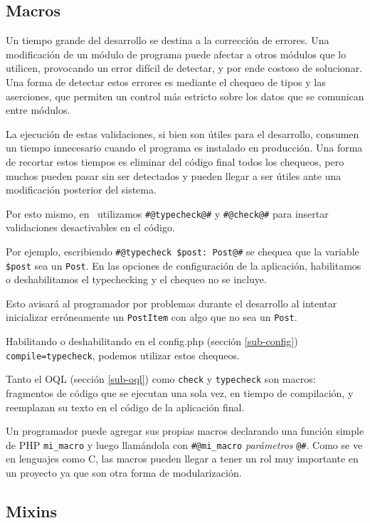 \subsection{Macros}
\label{sub-macros}

Un tiempo grande del desarrollo se destina a la corrección de errores. Una modificación de un módulo de programa puede afectar a otros módulos que lo utilicen, provocando un error difícil de detectar, y por ende costoso de solucionar. Una forma de detectar estos errores es mediante el chequeo de tipos y las aserciones, que permiten un control más estricto sobre los datos que se comunican entre módulos.

La ejecución de estas validaciones, si bien son útiles para el desarrollo, consumen un tiempo innecesario cuando el programa es instalado en producción. Una forma de recortar estos tiempos es eliminar del código final todos los chequeos, pero muchos pueden pasar sin ser detectados y pueden llegar a ser útiles ante una modificación posterior del sistema.

Por esto mismo, en \PWB\ utilizamos \verb'#@typecheck@#' y \verb'#@check@#' para insertar validaciones desactivables en el código.

Por ejemplo, escribiendo \verb"#@typecheck $post: Post@#" se chequea que la variable \verb"$post"
sea un \verb'Post'. En las opciones de configuración de la aplicación, habilitamos o deshabilitamos el typechecking y el chequeo no se incluye.


Esto avisará al programador por problemas durante el desarrollo al intentar inicializar erróneamente un \verb"PostItem" con algo que no sea un \verb'Post'.

Habilitando o deshabilitando en el config.php (sección \ref{sub-config}) \verb'compile=typecheck', podemos utilizar estos chequeos.

Tanto el OQL (sección \ref{sub-oql}) como \verb'check' y \verb'typecheck' son macros: fragmentos de código que se ejecutan una sola vez, en tiempo de compilación, y reemplazan su texto en el código de la aplicación final.

Un programador puede agregar sus propias macros declarando una función simple de PHP \verb"mi_macro" y luego llamándola con \verb"#@mi_macro" {\it parámetros} \verb"@#". Como se ve en lenguajes como C, las macros pueden llegar a tener un rol muy importante en un proyecto ya que son otra forma de modularización.
\subsection{Mixins}
\label{sub-mixins}

